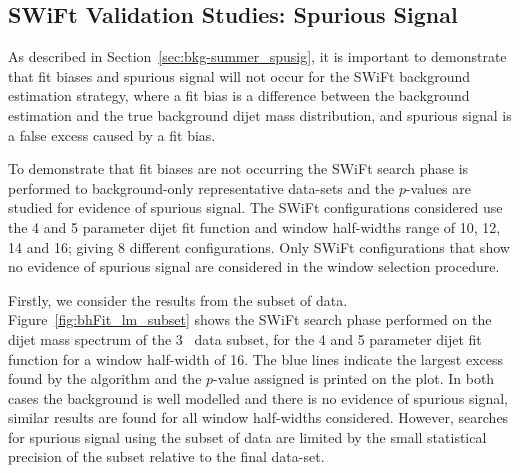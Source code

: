 
\subsection{SWiFt Validation Studies: Spurious Signal}
\label{sec:bkg-full_spuriousSignal}

As described in Section~\ref{sec:bkg-summer_spusig}, it is important to demonstrate that
fit biases and spurious signal will not occur for the SWiFt background estimation strategy,
where a fit bias is a difference between the background estimation
and the true background dijet mass distribution, and
spurious signal is a false excess caused by a fit bias.

To demonstrate that fit biases are not occurring the SWiFt search phase is performed to background-only representative data-sets
and the \bh{} $p$-values are studied for evidence of spurious signal.
The SWiFt configurations considered use the 4 and 5 parameter dijet fit function
and window half-widths range of 10, 12, 14 and 16; giving 8 different configurations.
Only SWiFt configurations that show no evidence of spurious signal are considered in the window selection procedure.

Firstly, we consider the results from the subset of data.
Figure~\ref{fig:bhFit_lm_subset} shows the SWiFt search phase performed on the dijet mass spectrum of the 3~\ifb{} data subset,
for the 4 and 5 parameter dijet fit function for a window half-width of 16.
The blue lines indicate the largest excess found by the \bh{} algorithm and the \mbox{$p$-value} assigned is printed on the plot. 
In both cases the background is well modelled and there is no evidence of spurious signal,
similar results are found for all window half-widths considered.
However, searches for spurious signal using the subset of data are limited by the 
small statistical precision of the subset relative to the final data-set.

